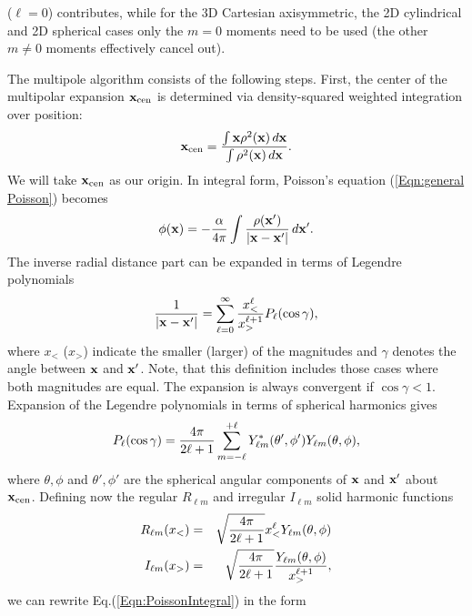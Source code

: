 ($\ell = 0$) contributes, while for the 3D Cartesian axisymmetric, the 2D cylindrical
and 2D spherical cases only the $m = 0$ moments need to be used (the other $m\neq 0$
moments effectively cancel out).
\par
The multipole algorithm consists of the following steps. First, the center of
the multipolar expansion ${\bf x}_{\rm cen}$ is determined via density-squared weighted
integration over position:
\begin{equation}
{\bf x}_{\rm cen} = {\int {\bf x}\rho^2({\bf x})\,d{\bf x} \over
                    \int \rho^2({\bf x})\,d{\bf x}}.
\end{equation}
We will take ${\bf x}_{\rm cen}$ as our origin.  In integral form, Poisson's
equation (\ref{Eqn:general Poisson}) becomes
\begin{equation}
\label{Eqn:PoissonIntegral}
\phi({\bf x}) = -{\alpha\over 4\pi}\int {\rho({\bf x}')\over
                |{\bf x} - {\bf x}'|}\,d{\bf x}'.
\end{equation}
The inverse radial distance part can be expanded in terms of Legendre
polynomials
\begin{equation}
\label{Eqn:Inverse distance Legendre}
{1\over |{\bf x} - {\bf x}'|} = \sum_{\ell=0}^\infty
{x_<^\ell\over x_>^{\ell+1}}P_\ell (\cos\gamma),
\end{equation}
where $x_<$ ($x_>$) indicate the smaller (larger) of the magnitudes
and $\gamma$ denotes the angle between ${\bf x}$ and ${\bf x}'$. Note, that this
definition includes those cases where both magnitudes are equal. The expansion
is always convergent if $\cos\gamma <1$. Expansion of the Legendre polynomials
in terms of spherical harmonics gives
\begin{equation}
\label{Eqn:Legendre spherical harmonics}
P_\ell (\cos\gamma) = {4\pi\over 2\ell+1}\sum_{m=-\ell}^{+\ell}
Y_{\ell m}^*(\theta',\phi') Y_{\ell m}(\theta,\phi),
\end{equation}
where $\theta,\phi$ and $\theta',\phi'$ are the spherical angular components of
${\bf x}$ and ${\bf x}'$ about ${\bf x}_{\rm cen}$.
Defining now the regular $R_{\ell m}$ and irregular $I_{\ell m}$ solid
harmonic functions
\begin{eqnarray}
R_{\ell m}(x_<) & = & \sqrt{{4\pi\over {2\ell+1}}}x_<^\ell Y_{\ell m}(\theta,\phi) \\
I_{\ell m}(x_>) & = & \sqrt{{4\pi\over {2\ell+1}}}{Y_{\ell m}(\theta,\phi)\over x_>^{\ell+1}},
\end{eqnarray}
we can rewrite Eq.(\ref{Eqn:PoissonIntegral}) in the form
